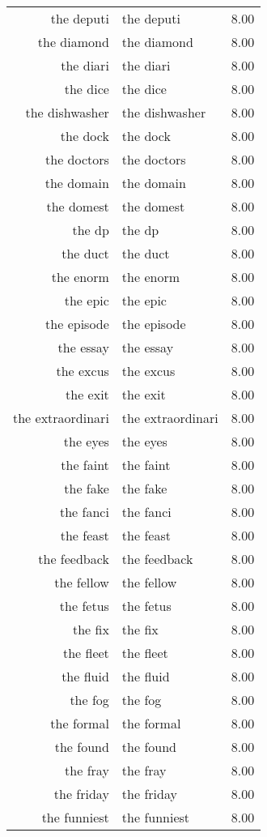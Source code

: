 \begin{table}[ht]
\begin{tabular}{rlr}
  the deputi & the deputi & 8.00 \\ 
  the diamond & the diamond & 8.00 \\ 
  the diari & the diari & 8.00 \\ 
  the dice & the dice & 8.00 \\ 
  the dishwasher & the dishwasher & 8.00 \\ 
  the dock & the dock & 8.00 \\ 
  the doctors & the doctors & 8.00 \\ 
  the domain & the domain & 8.00 \\ 
  the domest & the domest & 8.00 \\ 
  the dp & the dp & 8.00 \\ 
  the duct & the duct & 8.00 \\ 
  the enorm & the enorm & 8.00 \\ 
  the epic & the epic & 8.00 \\ 
  the episode & the episode & 8.00 \\ 
  the essay & the essay & 8.00 \\ 
  the excus & the excus & 8.00 \\ 
  the exit & the exit & 8.00 \\ 
  the extraordinari & the extraordinari & 8.00 \\ 
  the eyes & the eyes & 8.00 \\ 
  the faint & the faint & 8.00 \\ 
  the fake & the fake & 8.00 \\ 
  the fanci & the fanci & 8.00 \\ 
  the feast & the feast & 8.00 \\ 
  the feedback & the feedback & 8.00 \\ 
  the fellow & the fellow & 8.00 \\ 
  the fetus & the fetus & 8.00 \\ 
  the fix & the fix & 8.00 \\ 
  the fleet & the fleet & 8.00 \\ 
  the fluid & the fluid & 8.00 \\ 
  the fog & the fog & 8.00 \\ 
  the formal & the formal & 8.00 \\ 
  the found & the found & 8.00 \\ 
  the fray & the fray & 8.00 \\ 
  the friday & the friday & 8.00 \\ 
  the funniest & the funniest & 8.00 \\ 

\end{tabular}
\end{table}
